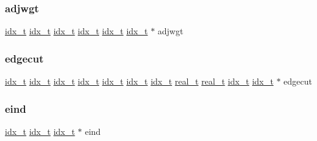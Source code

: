 \subsubsection{\texorpdfstring{adjwgt}{adjwgt}}
{\footnotesize\ttfamily \hyperlink{a00876_aaa5262be3e700770163401acb0150f52}{idx\+\_\+t} \hyperlink{a00876_aaa5262be3e700770163401acb0150f52}{idx\+\_\+t} \hyperlink{a00876_aaa5262be3e700770163401acb0150f52}{idx\+\_\+t} \hyperlink{a00876_aaa5262be3e700770163401acb0150f52}{idx\+\_\+t} \hyperlink{a00876_aaa5262be3e700770163401acb0150f52}{idx\+\_\+t} \hyperlink{a00876_aaa5262be3e700770163401acb0150f52}{idx\+\_\+t} $\ast$ adjwgt}

\mbox{\label{a00876_a23c879843fabf8a8f48b25a4a8ab5bf2}} 
\subsubsection{\texorpdfstring{edgecut}{edgecut}}
{\footnotesize\ttfamily \hyperlink{a00876_aaa5262be3e700770163401acb0150f52}{idx\+\_\+t} \hyperlink{a00876_aaa5262be3e700770163401acb0150f52}{idx\+\_\+t} \hyperlink{a00876_aaa5262be3e700770163401acb0150f52}{idx\+\_\+t} \hyperlink{a00876_aaa5262be3e700770163401acb0150f52}{idx\+\_\+t} \hyperlink{a00876_aaa5262be3e700770163401acb0150f52}{idx\+\_\+t} \hyperlink{a00876_aaa5262be3e700770163401acb0150f52}{idx\+\_\+t} \hyperlink{a00876_aaa5262be3e700770163401acb0150f52}{idx\+\_\+t} \hyperlink{a00876_a1924a4f6907cc3833213aba1f07fcbe9}{real\+\_\+t} \hyperlink{a00876_a1924a4f6907cc3833213aba1f07fcbe9}{real\+\_\+t} \hyperlink{a00876_aaa5262be3e700770163401acb0150f52}{idx\+\_\+t} \hyperlink{a00876_aaa5262be3e700770163401acb0150f52}{idx\+\_\+t} $\ast$ edgecut}

\mbox{\label{a00876_afc8f92586bfa2e77fef6615e0da67d0c}} 
\subsubsection{\texorpdfstring{eind}{eind}}
{\footnotesize\ttfamily \hyperlink{a00876_aaa5262be3e700770163401acb0150f52}{idx\+\_\+t} \hyperlink{a00876_aaa5262be3e700770163401acb0150f52}{idx\+\_\+t} \hyperlink{a00876_aaa5262be3e700770163401acb0150f52}{idx\+\_\+t} $\ast$ eind}

